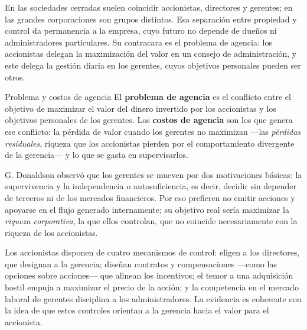 En las sociedades cerradas suelen coincidir accionistas, directores y gerentes; en las grandes corporaciones son grupos distintos. Esa separación entre propiedad y control da permanencia a la empresa, cuyo futuro no depende de dueños ni administradores particulares. Su contracara es el problema de agencia: los accionistas delegan la maximización del valor en un consejo de administración, y este delega la gestión diaria en los gerentes, cuyos objetivos personales pueden ser otros.

\begin{definicion}{Problema y costos de agencia}
El \textbf{problema de agencia} es el conflicto entre el objetivo de maximizar el valor del dinero invertido por los accionistas y los objetivos personales de los gerentes. Los \textbf{costos de agencia} son los que genera ese conflicto: la pérdida de valor cuando los gerentes no maximizan —las \emph{pérdidas residuales}, riqueza que los accionistas pierden por el comportamiento divergente de la gerencia— y lo que se gasta en supervisarlos.
\end{definicion}

G. Donaldson observó que los gerentes se mueven por dos motivaciones básicas: la supervivencia y la independencia o autosuficiencia, es decir, decidir sin depender de terceros ni de los mercados financieros. Por eso prefieren no emitir acciones y apoyarse en el flujo generado internamente; su objetivo real sería maximizar la \emph{riqueza corporativa}, la que ellos controlan, que no coincide necesariamente con la riqueza de los accionistas.

Los accionistas disponen de cuatro mecanismos de control: eligen a los directores, que designan a la gerencia; diseñan contratos y compensaciones —como las opciones sobre acciones— que alinean los incentivos; el temor a una adquisición hostil empuja a maximizar el precio de la acción; y la competencia en el mercado laboral de gerentes disciplina a los administradores. La evidencia es coherente con la idea de que estos controles orientan a la gerencia hacia el valor para el accionista.

